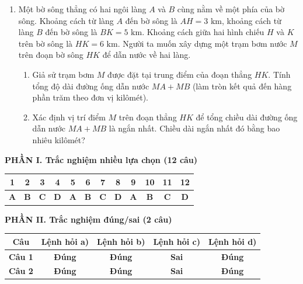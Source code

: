 \documentclass[12pt,a4paper]{article}
\newcommand{\parttitle}[1]{\par\vspace{1.5pt}\needspace{2\baselineskip}{\large\bfseries\color{ink}#1}\par\nopagebreak\vspace{1pt}}
\begin{document}
\begin{enumerate}
\item Một bờ sông thẳng có hai ngôi làng $A$ và $B$ cùng nằm về một phía của bờ sông. Khoảng cách từ làng $A$ đến bờ sông là $AH = 3\text{ km}$, khoảng cách từ làng $B$ đến bờ sông là $BK = 5\text{ km}$. Khoảng cách giữa hai hình chiếu $H$ và $K$ trên bờ sông là $HK = 6\text{ km}$. Người ta muốn xây dựng một trạm bơm nước $M$ trên đoạn bờ sông $HK$ để dẫn nước về hai làng.
\begin{enumerate}
    \item Giả sử trạm bơm $M$ được đặt tại trung điểm của đoạn thẳng $HK$. Tính tổng độ dài đường ống dẫn nước $MA + MB$ (làm tròn kết quả đến hàng phần trăm theo đơn vị kilômét).
    \item Xác định vị trí điểm $M$ trên đoạn thẳng $HK$ để tổng chiều dài đường ống dẫn nước $MA + MB$ là ngắn nhất. Chiều dài ngắn nhất đó bằng bao nhiêu kilômét?
\end{enumerate}
\end{enumerate}

\newpage

\pagestyle{dapan}
\parttitle{BẢNG ĐÁP ÁN TỔNG HỢP}

\vspace{0.2cm}
\noindent\textbf{PHẦN I. Trắc nghiệm nhiều lựa chọn (12 câu)}
\vspace{0.15cm}

\begin{center}
\begin{tabular}{|c|c|c|c|c|c|c|c|c|c|c|c|}
\hline
\textbf{1} & \textbf{2} & \textbf{3} & \textbf{4} & \textbf{5} & \textbf{6} & \textbf{7} & \textbf{8} & \textbf{9} & \textbf{10} & \textbf{11} & \textbf{12} \\
\hline
\textbf{A} & \textbf{B} & \textbf{C} & \textbf{D} & \textbf{A} & \textbf{B} & \textbf{C} & \textbf{D} & \textbf{A} & \textbf{B} & \textbf{C} & \textbf{D} \\
\hline
\end{tabular}
\end{center}

\vspace{0.3cm}
\noindent\textbf{PHẦN II. Trắc nghiệm đúng/sai (2 câu)}
\vspace{0.15cm}

\begin{center}
\begin{tabular}{|c|c|c|c|c|}
\hline
\textbf{Câu} & \textbf{Lệnh hỏi a)} & \textbf{Lệnh hỏi b)} & \textbf{Lệnh hỏi c)} & \textbf{Lệnh hỏi d)} \\
\hline
\textbf{Câu 1} & \textbf{Đúng} & \textbf{Đúng} & \textbf{Sai} & \textbf{Đúng} \\
\hline
\textbf{Câu 2} & \textbf{Đúng} & \textbf{Đúng} & \textbf{Sai} & \textbf{Đúng} \\
\hline
\end{tabular}
\end{center}
\end{document}
